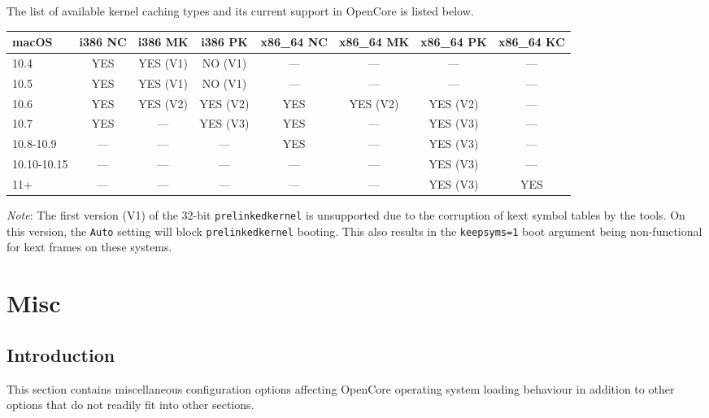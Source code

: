 \documentclass[]{article}
\begin{document}
\begin{enumerate}
  The list of available kernel caching types and its current support in OpenCore is listed below.

  \begin{center}
  \begin{tabular}{|p{0.67in}|c|c|c|c|c|c|c|}
  \hline
  \textbf{macOS} & \textbf{i386 NC} & \textbf{i386 MK} & \textbf{i386 PK} & \textbf{x86\_64 NC} & \textbf{x86\_64 MK} & \textbf{x86\_64 PK} & \textbf{x86\_64 KC} \\
  \hline
  10.4 & YES & YES (V1) & NO (V1) & --- & --- & --- & --- \\
  \hline
  10.5 & YES & YES (V1) & NO (V1) & --- & --- & --- & --- \\
  \hline
  10.6 & YES & YES (V2) & YES (V2) & YES & YES (V2) & YES (V2) & --- \\
  \hline
  10.7 & YES & --- & YES (V3) & YES & --- & YES (V3) & --- \\
  \hline
  10.8-10.9 & --- & --- & --- & YES & --- & YES (V3) & --- \\
  \hline
  10.10-10.15 & --- & --- & --- & --- & --- & YES (V3) & --- \\
  \hline
  11+ & --- & --- & --- & --- & --- & YES (V3) & YES \\
  \hline
  \end{tabular}
  \end{center}

  \emph{Note}: The first version (V1) of the 32-bit \texttt{prelinkedkernel} is unsupported due to
  the corruption of kext symbol tables by the tools. On this version, the \texttt{Auto} setting will
  block \texttt{prelinkedkernel} booting. This also results in the \texttt{keepsyms=1} boot argument
  being non-functional for kext frames on these systems.

\end{enumerate}


\section{Misc}\label{misc}

\subsection{Introduction}\label{miscintro}

This section contains miscellaneous configuration options affecting OpenCore operating system
loading behaviour in addition to other options that do not readily fit into other sections.
\end{document}
